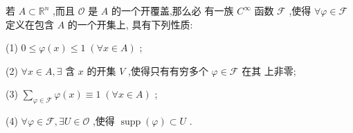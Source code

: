 \documentclass[lang=cn,newtx,10pt,scheme=chinese,thmcnt=chapter]{elegantbook}
\begin{document}
\begin{theorem}[单位分解定理]
    若 \( A \subset  {\mathbb{R}}^{n} \) ,而且 \( \mathcal{O} \) 是 \( A \) 的一个开覆盖,那么必
有一族 \( {C}^{\infty } \) 函数 \( \mathcal{F} \) ,使得 \( \forall \varphi  \in  \mathcal{F} \) 定义在包含 \( A \) 的一个开集上,
具有下列性质:

(1) \( 0 \leq  \varphi \left( x\right)  \leq  1\;\left( {\forall x \in  A}\right) \) ;

(2) \( \forall x \in  A,\exists \) 含 \( x \) 的开集 \( V \) ,使得只有有穷多个 \( \varphi  \in  \mathcal{F} \) 在其
上非零;

(3) \( \mathop{\sum }\limits_{{\varphi  \in  \mathcal{F}}}\varphi \left( x\right)  \equiv  1\;\left( {\forall x \in  A}\right) \) ;

(4) \( \forall \varphi  \in  \mathcal{F},\exists U \in  \mathcal{O} \) ,使得 \( \operatorname{supp}\left( \varphi \right)  \subset  U \) .
\end{theorem}
\end{document}
